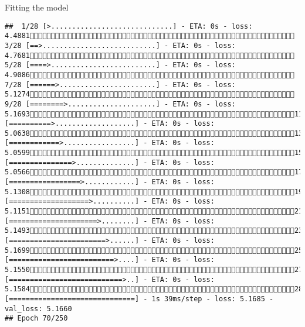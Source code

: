 \documentclass[
  ignorenonframetext,
]{beamer}
\begin{document}
\begin{frame}[fragile]{Fitting the model}
\begin{verbatim}
##  1/28 [>.............................] - ETA: 0s - loss: 4.4881 3/28 [==>...........................] - ETA: 0s - loss: 4.7681 5/28 [====>.........................] - ETA: 0s - loss: 4.9086 7/28 [======>.......................] - ETA: 0s - loss: 5.1274 9/28 [========>.....................] - ETA: 0s - loss: 5.169311/28 [==========>...................] - ETA: 0s - loss: 5.063813/28 [============>.................] - ETA: 0s - loss: 5.059915/28 [===============>..............] - ETA: 0s - loss: 5.056617/28 [=================>............] - ETA: 0s - loss: 5.130819/28 [===================>..........] - ETA: 0s - loss: 5.115121/28 [=====================>........] - ETA: 0s - loss: 5.149323/28 [=======================>......] - ETA: 0s - loss: 5.169925/28 [=========================>....] - ETA: 0s - loss: 5.155027/28 [===========================>..] - ETA: 0s - loss: 5.158428/28 [==============================] - 1s 39ms/step - loss: 5.1685 - val_loss: 5.1660
## Epoch 70/250

\end{verbatim}
\end{frame}
\end{document}
